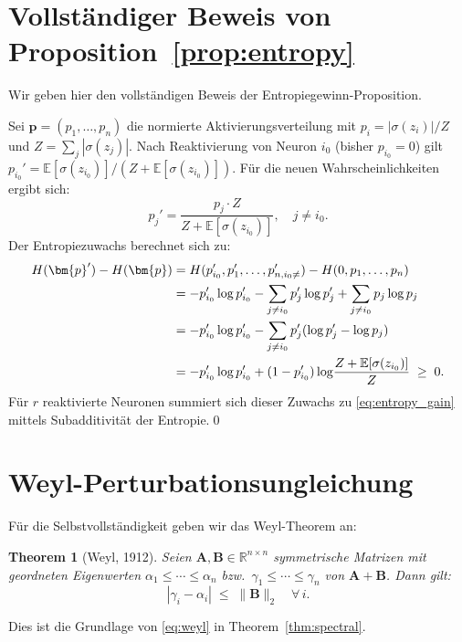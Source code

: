 ﻿\documentclass[12pt, a4paper, openany]{report}
\newtheorem{theorem}{Theorem}[chapter]
\newcommand{\R}{\mathbb{R}}
\newcommand{\E}{\mathbb{E}}
\newcommand{\abs}[1]{\left|#1\right|}
\begin{document}
\section{Vollständiger Beweis von Proposition~\ref{prop:entropy}}

Wir geben hier den vollständigen Beweis der Entropiegewinn-Proposition.

Sei $\bm{p} = (p_1, \ldots, p_n)$ die normierte Aktivierungsverteilung
mit $p_i = |\sigma(z_i)| / Z$ und $Z = \sum_j |\sigma(z_j)|$.
Nach Reaktivierung von Neuron $i_0$ (bisher $p_{i_0} = 0$) gilt
$p_{i_0}' = \E[\sigma(z_{i_0})] / (Z + \E[\sigma(z_{i_0})])$.
Für die neuen Wahrscheinlichkeiten ergibt sich:
\[
  p_j' = \frac{p_j \cdot Z}{Z + \E[\sigma(z_{i_0})]}, \quad j \neq i_0.
\]
Der Entropiezuwachs berechnet sich zu:
\begin{align}
  H(\bm{p}') - H(\bm{p})
  &= H(p_{i_0}', p_1', \ldots, p_{n, i_0\neq}') - H(0, p_1, \ldots, p_n) \notag \\
  &= -p_{i_0}'\log p_{i_0}'
     - \sum_{j \neq i_0} p_j' \log p_j'
     + \sum_{j \neq i_0} p_j \log p_j \notag \\
  &= -p_{i_0}'\log p_{i_0}'
     - \sum_{j \neq i_0} p_j' (\log p_j' - \log p_j) \notag \\
  &= -p_{i_0}'\log p_{i_0}'
     + (1 - p_{i_0}') \log\!\frac{Z + \E[\sigma(z_{i_0})]}{Z}
     \;\geq\; 0.
\end{align}
Für $r$ reaktivierte Neuronen summiert sich dieser Zuwachs zu
\eqref{eq:entropy_gain} mittels Subadditivität der Entropie.\qed

\section{Weyl-Perturbationsungleichung}

Für die Selbstvollständigkeit geben wir das Weyl-Theorem an:

\begin{theorem}[Weyl, 1912]
Seien $\bm{A}, \bm{B} \in \R^{n\times n}$ symmetrische Matrizen mit
geordneten Eigenwerten $\alpha_1 \leq \cdots \leq \alpha_n$ bzw.\
$\gamma_1 \leq \cdots \leq \gamma_n$ von $\bm{A}+\bm{B}$.  Dann gilt:
\[
  \abs{\gamma_i - \alpha_i} \;\leq\; \|\bm{B}\|_2 \quad \forall\, i.
\]
\end{theorem}

Dies ist die Grundlage von \eqref{eq:weyl} in Theorem~\ref{thm:spectral}.
\end{document}
